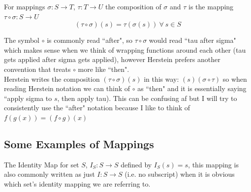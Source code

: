 \begin{definition}
For mappings $\sigma: S\rightarrow T$, $\tau: T\rightarrow U$ the composition of $\sigma$ and $\tau$ is the mapping $\tau \circ \sigma: S\rightarrow U$ 
\begin{equation}
    (\tau \circ \sigma)(s) = \tau(\sigma(s)) \ \forall \ s \in S \nonumber
\end{equation}
\end{definition}
\newpage
\begin{notation}
The symbol $\circ$ is commonly read ``after", so $\tau \circ \sigma$ would read ``tau after sigma" which makes sense when we think of wrapping functions around each other (tau gets applied after sigma gets applied), however Herstein prefers another convention that treats $\circ$ more like ``then".\steezybreak\\
Herstein writes the composition $(\tau \circ \sigma)(s)$ in this way: $ (s)(\sigma \circ \tau)$ so when reading Herstein notation we can think of $\circ$ as ``then" and it is essentially saying ``apply sigma to $s$, then apply tau). This can be confusing af but I will try to consistently use the ``after" notation because I like to think of $f(g(x))=(f\circ g) (x)$
\end{notation}

\subsection{Some Examples of Mappings}
\begin{example}
The Identity Map for set $S$,  $I_S: S\rightarrow S$ defined by $I_S(s)=s$, this mapping is also commonly written as just $I: S\rightarrow S$ (i.e. no subscript) when it is obvious which set's identity mapping we are referring to.
\end{example}

